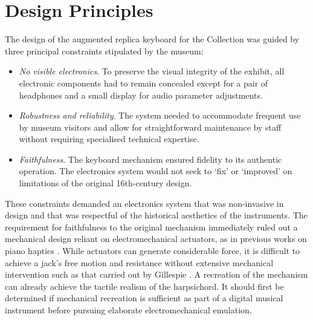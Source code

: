 \section{Design Principles}\label{design}

The design of the augmented replica keyboard for the  Collection was guided by three principal constraints stipulated by the museum:

\begin{itemize}
    \item \emph{No visible electronics}. To preserve the visual integrity of the exhibit, all electronic components had to remain concealed except for a pair of headphones and a small display for audio parameter adjustments.
    \item \emph{Robustness and reliability}. The system needed to accommodate frequent use by museum visitors and allow for straightforward maintenance by staff without requiring specialised technical expertise.
    \item \emph{Faithfulness}. The keyboard mechanism ensured fidelity to its authentic operation. The electronics system would not seek to `fix' or `improved' on limitations of the original 16th-century design. 
\end{itemize}

These constraints demanded an electronics system that was non-invasive in design and that was respectful of the historical aesthetics of the instruments. The requirement for faithfulness to the original mechanism immediately ruled out a mechanical design reliant on electromechanical actuators, as in previous works on piano haptics \cite{Timmermans2020,Gillespie1996}. 
While actuators can generate considerable force, it is difficult to achieve a jack's free motion and resistance without extensive mechanical intervention such as that carried out by Gillespie \cite{Gillespie1996}. A recreation of the mechanism can already achieve the tactile realism of the harpsichord.
It should first be determined if mechanical recreation is sufficient as part of a digital musical instrument before pursuing elaborate electromechanical emulation. 

